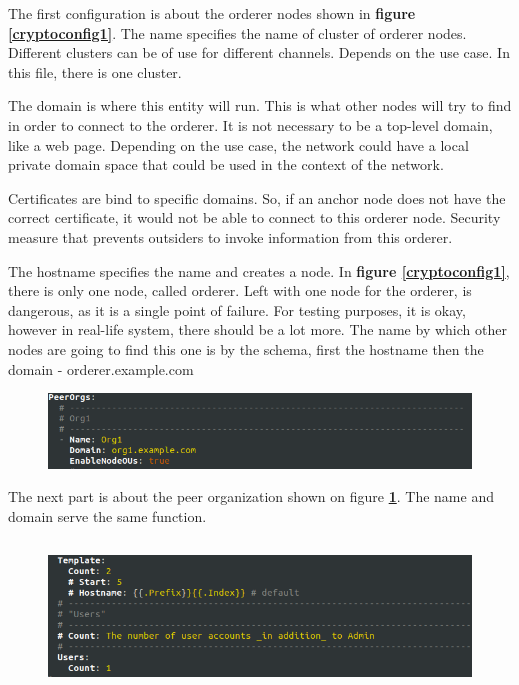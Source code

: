 \documentclass[a4paper,11pt]{report}
\begin{document}
The first configuration is about the orderer nodes shown in \textbf{figure \ref{cryptoconfig1}}. The name specifies the name of cluster of orderer nodes. Different clusters can be of use for different channels. Depends on the use case. In this file, there is one cluster.

The domain is where this entity will run. This is what other nodes will try to find in order to connect to the orderer. It is not necessary to be a top-level domain, like a web page. Depending on the use case, the network could have a local private domain space that could be used in the context of the network.

Certificates are bind to specific domains. So, if an anchor node does not have the correct certificate, it would not be able to connect to this orderer node. Security measure that prevents outsiders to invoke information from this orderer.

The hostname specifies the name and creates a node. In \textbf{figure \ref{cryptoconfig1}}, there is only one node, called orderer. Left with one node for the orderer, is dangerous, as it is a single point of failure. For testing purposes, it is okay, however in real-life system, there should be a lot more. The name by which other nodes are going to find this one is by the schema, first the hostname then the domain - orderer.example.com

\begin{figure}[h]
\centering
  \includegraphics[width = 16cm]{cryptoconfig2.png}
  \caption{ }
  \label{cryptoconfig2}
\end{figure}

The next part is about the peer organization shown on figure \textbf{\ref{cryptoconfig2}}. The name and domain serve the same function. 

\begin{figure}[h]
\centering
  \includegraphics[height = 4cm,width = 16cm]{cryptoconfig3.png}
  \caption{ }
  \label{cryptoconfig3}
\end{figure}
\end{document}
